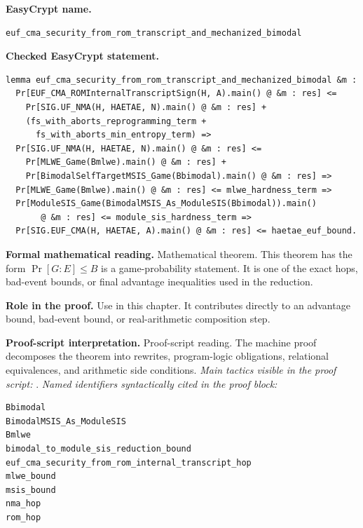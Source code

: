 \begin{formaltheorem}
\noindent\textbf{EasyCrypt name.}
\begin{lstlisting}[language=EasyCrypt,basicstyle=\ttfamily\scriptsize]
euf_cma_security_from_rom_transcript_and_mechanized_bimodal
\end{lstlisting}
\noindent\textbf{Checked EasyCrypt statement.}
\begin{lstlisting}[language=EasyCrypt,basicstyle=\ttfamily\scriptsize]
lemma euf_cma_security_from_rom_transcript_and_mechanized_bimodal &m :
  Pr[EUF_CMA_ROMInternalTranscriptSign(H, A).main() @ &m : res] <=
    Pr[SIG.UF_NMA(H, HAETAE, N).main() @ &m : res] +
    (fs_with_aborts_reprogramming_term +
      fs_with_aborts_min_entropy_term) =>
  Pr[SIG.UF_NMA(H, HAETAE, N).main() @ &m : res] <=
    Pr[MLWE_Game(Bmlwe).main() @ &m : res] +
    Pr[BimodalSelfTargetMSIS_Game(Bbimodal).main() @ &m : res] =>
  Pr[MLWE_Game(Bmlwe).main() @ &m : res] <= mlwe_hardness_term =>
  Pr[ModuleSIS_Game(BimodalMSIS_As_ModuleSIS(Bbimodal)).main()
       @ &m : res] <= module_sis_hardness_term =>
  Pr[SIG.EUF_CMA(H, HAETAE, A).main() @ &m : res] <= haetae_euf_bound.
\end{lstlisting}
\noindent\textbf{Formal mathematical reading.}
Mathematical theorem. This theorem has the form \(\Pr[G:E] \le B\) is a game-probability statement.  It is one of the exact hops, bad-event bounds, or final advantage inequalities used in the reduction.

\noindent\textbf{Role in the proof.}
Use in this chapter. It contributes directly to an advantage bound, bad-event bound, or real-arithmetic composition step.

\noindent\textbf{Proof-script interpretation.}
Proof-script reading. The machine proof decomposes the theorem into rewrites, program-logic obligations, relational equivalences, and arithmetic side conditions.
\emph{Main tactics visible in the proof script:} .
\emph{Named identifiers syntactically cited in the proof block:}
\begin{lstlisting}[language=EasyCrypt,basicstyle=\ttfamily\scriptsize]
Bbimodal
BimodalMSIS_As_ModuleSIS
Bmlwe
bimodal_to_module_sis_reduction_bound
euf_cma_security_from_rom_internal_transcript_hop
mlwe_bound
msis_bound
nma_hop
rom_hop
\end{lstlisting}

\end{formaltheorem}

